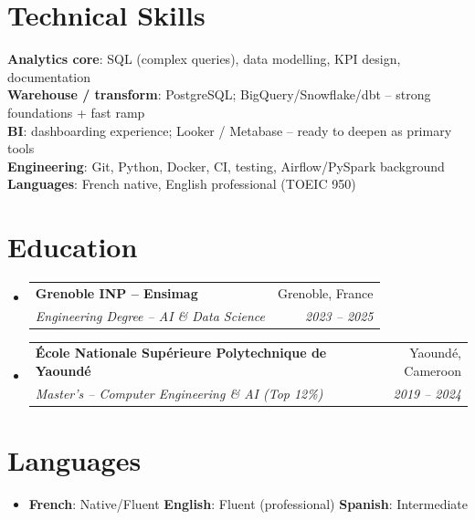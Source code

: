 \documentclass[letterpaper,10.5pt]{article}
\makeatletter
\newcommand{\resumeSubheading}[4]{
  \vspace{3pt}\item
  \begin{tabular*}{0.97\textwidth}[t]{l@{\extracolsep{\fill}}r}
    \textbf{#1} & #2 \\
    \textit{\small #3} & \textit{\small #4} \\
  \end{tabular*}\vspace{1pt}
}
\newcommand{\resumeSubHeadingListStart}{\begin{itemize}[leftmargin=0.08in, label={}]}
\newcommand{\resumeSubHeadingListEnd}{\end{itemize}}
\makeatother
\begin{document}
\section{Technical Skills}
\begin{itemize}[leftmargin=0.08in, label={}]
  \small{\item{
    \textbf{Analytics core}: SQL (complex queries), data modelling, KPI design, documentation \\
    \textbf{Warehouse / transform}: PostgreSQL; BigQuery/Snowflake/dbt -- strong foundations + fast ramp \\
    \textbf{BI}: dashboarding experience; Looker / Metabase -- ready to deepen as primary tools \\
    \textbf{Engineering}: Git, Python, Docker, CI, testing, Airflow/PySpark background \\
    \textbf{Languages}: French native, English professional (TOEIC 950)
  }}
\end{itemize}

\section{Education}
\resumeSubHeadingListStart
  \resumeSubheading
    {Grenoble INP -- Ensimag}{Grenoble, France}
    {Engineering Degree -- AI \& Data Science}{2023 -- 2025}
  \resumeSubheading
    {\'Ecole Nationale Sup\'erieure Polytechnique de Yaound\'e}{Yaound\'e, Cameroon}
    {Master's -- Computer Engineering \& AI (Top 12\%)}{2019 -- 2024}
\resumeSubHeadingListEnd

\section{Languages}
\begin{itemize}[leftmargin=0.08in, label={}]
  \item \textbf{French}: Native/Fluent \quad \textbf{English}: Fluent (professional) \quad \textbf{Spanish}: Intermediate
\end{itemize}
\end{document}
